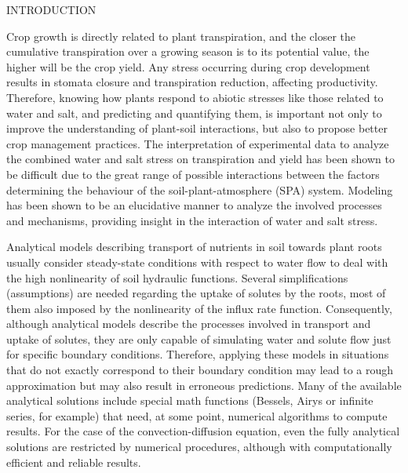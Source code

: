 \cleardoublepage

\def\quic{Quirijn's COMMENT: }

\chap INTRODUCTION

Crop growth is directly related to plant transpiration, and the closer the cumulative transpiration over a growing season is to its potential value, the higher will be the crop yield. 
Any stress occurring during crop development results in stomata closure and transpiration reduction, affecting productivity. 
Therefore, knowing how plants respond to abiotic stresses like those related to water and salt, and predicting and quantifying them, is important not only to improve the understanding of plant-soil interactions, but also to propose better crop management practices.
The interpretation of experimental data to analyze the combined water and salt stress on transpiration and yield has been shown to be difficult due to the great range of possible interactions between the factors determining the behaviour of the soil-plant-atmosphere (SPA) system.
Modeling has been shown to be an elucidative manner to analyze the involved processes and mechanisms, providing insight in the interaction of water and salt stress.

Analytical models describing transport of nutrients in soil towards plant roots usually consider steady-state conditions with respect to water flow to deal with the high nonlinearity of soil hydraulic functions. 
Several simplifications (assumptions) are needed regarding the uptake of solutes by the roots, most of them also imposed by the nonlinearity of the influx rate function. 
Consequently, although analytical models describe the processes involved in transport and uptake of solutes, they are only capable of simulating water and solute flow just for specific boundary conditions.
Therefore, applying these models in situations that do not exactly correspond to their boundary condition may lead to a rough approximation but may also result in erroneous predictions.
Many of the available analytical solutions include special math functions (Bessels, Airys or infinite series, for example) that need, at some point, numerical algorithms to compute results.
For the case of the convection-diffusion equation, even the fully analytical solutions are restricted by numerical procedures, although with computationally efficient and reliable results.

